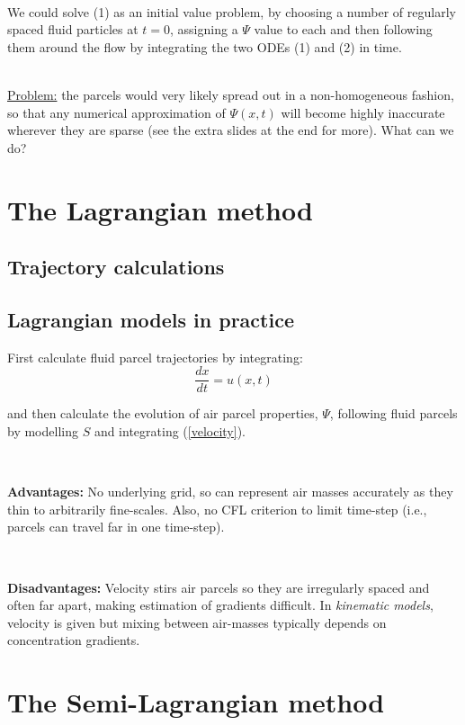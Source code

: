 ~

We could solve (1) as an initial value problem, by choosing a number of regularly spaced fluid particles at $t=0$, assigning a $\Psi$ value to each and then following them around the flow by integrating the two ODEs (1) and (2) in time.\\

~

\underline{Problem:} the parcels would very likely spread out in a non-homogeneous fashion, so that any numerical approximation of $\Psi(x,t)$ will become highly inaccurate wherever they are sparse (see the extra slides at the end for more). What can we do?

\section{The Lagrangian method}
\subsection{Trajectory calculations}
\subsection{Lagrangian models in practice}

\setcounter{equation}{2}	
	First calculate fluid parcel trajectories by
	integrating:
	\begin{equation}
	\frac{{d x}}{d t}={ u}({ x},t)
	\label{velocity}	
	\end{equation}
	
	and then calculate the evolution of air parcel properties, $\Psi$,
	following fluid parcels by modelling $S$ and integrating
	(\ref{velocity}).
	
	~
	
	{\bf Advantages:} No underlying grid, so can represent air masses
	accurately as they thin to arbitrarily fine-scales. Also, no CFL
	criterion to limit time-step (i.e., parcels can travel far in one
	time-step).
	
	~
	
	{\bf Disadvantages:} Velocity stirs air parcels so they are
	irregularly spaced and often far apart, making estimation of gradients
	difficult. In {\em kinematic models}, velocity is given but mixing
	between air-masses typically depends on concentration gradients. 
	

\section{The Semi-Lagrangian method}

